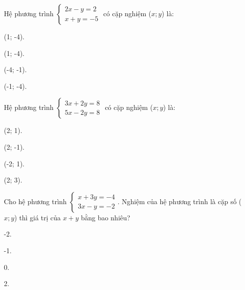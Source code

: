 \documentclass[%
    fontsize=12pt,%
    chapterprefix=false,%
    open=right,%
    twoside=false,%
    numbers=noenddot,%
    headings=optiontohead,%
    final,%
    DIV=15,%
    parskip=half %
]{scrbook}
\begin{document}
\begin{tracnghiem}
\item Hệ phương trình $ \begin{cases} 2x - y = 2 \\ x + y = -5 \end{cases} $ có cặp nghiệm ($ x; y $) là:
\begin{options}
  \item (1; -4).
  \item (1; -4).
  \item (-4; -1).
  \item (-1; -4).
\end{options}

\item Hệ phương trình $ \begin{cases} 3x + 2y = 8 \\ 5x - 2y = 8 \end{cases} $ có cặp nghiệm ($ x; y $) là:
\begin{options}
  \item (2; 1).
  \item (2; -1).
  \item (-2; 1).
  \item (2; 3).
\end{options}

\item Cho hệ phương trình $ \begin{cases} x + 3y = -4 \\ 3x - y = -2 \end{cases} $. Nghiệm của hệ phương trình là cặp số ($ x; y $) thì giá trị của $ x + y $ bằng bao nhiêu?
\begin{options}
  \item -2.
  \item -1.
  \item 0.
  \item 2.
\end{options}


\end{tracnghiem}
\end{document}
